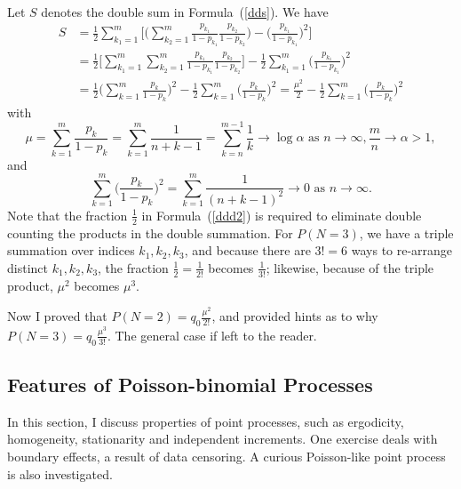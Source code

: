 \documentclass[10pt]{article}
\begin{document}
\begin{Exercise}
\begin{align}
\end{align}
Let $S$ denotes the double sum in Formula~(\ref{dds}). We have
\begin{align}
S & =\frac{1}{2}\sum_{k_1=1}^m \Big[ \Big(\sum_{k_2=1}^m \frac{p_{k_1}}{1-p_{k_1}}\frac{p_{k_2}}{1-p_{k_2}}\Big)-  \Big( \frac{p_{k_1}}{1-p_{k_1}}\Big)^2\Big]\label{ddd2}\\
 & = \frac{1}{2}\Big[\sum_{k_1=1}^m \sum_{k_2=1}^m \frac{p_{k_1}}{1-p_{k_1}}\frac{p_{k_2}}{1-p_{k_2}}\Big] - \frac{1}{2}\sum_{k_1=1}^m \Big( \frac{p_{k_1}}{1-p_{k_1}}\Big)^2 \nonumber \\
&  =\frac{1}{2} \Big(\sum_{k=1}^m \frac{p_{k}}{1-p_{k}}\Big)^2 - \frac{1}{2}\sum_{k=1}^m \Big( \frac{p_{k}}{1-p_{k}}\Big)^2 = \frac{\mu^2}{2}- \frac{1}{2}\sum_{k=1}^m \Big( \frac{p_{k}}{1-p_{k}}\Big)^2 \nonumber
\end{align}
with 
$$\mu = \sum_{k=1}^m \frac{p_{k}}{1-p_{k}}=\sum_{k=1}^m\frac{1}{n+k-1}
=\sum_{k=n}^{m-1}\frac{1}{k} \rightarrow \log\alpha \mbox{ as  } n\rightarrow\infty,  \frac{m}{n} \rightarrow \alpha >1,$$
and
$$ \sum_{k=1}^m \Big( \frac{p_{k}}{1-p_{k}}\Big)^2 = \sum_{k=1}^m \frac{1}{(n+k-1)^2}\rightarrow 0 \mbox{ as } n\rightarrow\infty.$$
Note that the fraction $\frac{1}{2}$ in Formula~(\ref{ddd2}) is required to eliminate double counting the products in the double summation. For $P(N=3)$, we have a triple summation over indices $k_1, k_2, k_3$,
and because there are $3!=6$ ways to re-arrange distinct $k_1,k_2,k_3$, the fraction $\frac{1}{2}=\frac{1}{2!}$ becomes $\frac{1}{3!}$; likewise, because of the triple product, $\mu^2$ becomes $\mu^3$. 

Now I proved that $P(N=2)=q_0\frac{\mu^2}{2!}$, and provided hints as to why $P(N=3)=q_0\frac{\mu^3}{3!}$. The general case if left to the reader.
\end{Exercise}


\subsection{Features of Poisson-binomial Processes}\label{fpbp}

In this section, I discuss properties of point processes, such as ergodicity, homogeneity, stationarity and independent increments. One exercise deals with boundary effects, a result of data censoring. A curious Poisson-like point process is also investigated.
\end{document}
